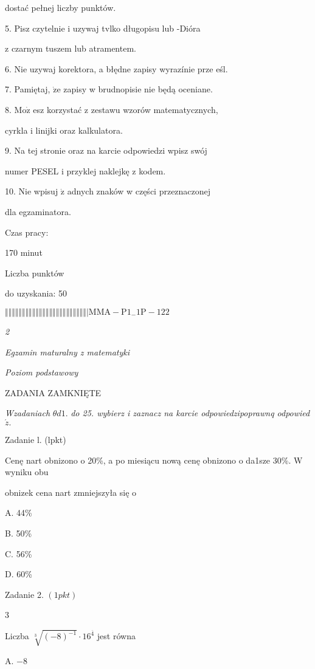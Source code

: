 \documentclass[a4paper,12pt]{article}
\begin{document}
dostać pełnej liczby punktów.

5. Pisz czytelnie i uzywaj tvlko długopisu lub -Dióra

z czarnym tuszem lub atramentem.

6. Nie uzywaj korektora, a błędne zapisy wyrazínie prze eśl.

7. Pamiętaj, $\dot{\mathrm{z}}\mathrm{e}$ zapisy w brudnopisie nie będą oceniane.

8. $\mathrm{M}\mathrm{o}\dot{\mathrm{z}}$ esz korzystać z zestawu wzorów matematycznych,

cyrkla i linijki oraz kalkulatora.

9. Na tej stronie oraz na karcie odpowiedzi wpisz swój

numer PESEL i przyklej naklejkę z kodem.

10. Nie wpisuj $\dot{\mathrm{z}}$ adnych znaków w części przeznaczonej

dla egzaminatora.

Czas pracy:

170 minut

Liczba punktów

do uzyskania: 50

$\Vert\Vert\Vert\Vert\Vert\Vert\Vert\Vert\Vert\Vert\Vert\Vert\Vert\Vert\Vert\Vert\Vert\Vert\Vert\Vert\Vert\Vert\Vert\Vert|  \mathrm{M}\mathrm{M}\mathrm{A}-\mathrm{P}1_{-}1\mathrm{P}-122$




{\it 2}

{\it Egzamin maturalny z matematyki}

{\it Poziom podstawowy}

ZADANIA ZAMKNIĘTE

{\it Wzadaniach} $\theta d1.$ {\it do 25. wybierz i zaznacz na karcie odpowiedzipoprawnq odpowied} $\acute{z}.$

Zadanie l. (lpkt)

Cenę nart obnizono o 20\%, a po miesiącu nową cenę obnizono o da1sze 30\%. W wyniku obu

obnizek cena nart zmniejszyła się o

A. 44\%

B. 50\%

C. 56\%

D. 60\%

Zadanie 2. $(1pkt)$

3

Liczba $\sqrt[3]{(-8)^{-1}}\cdot 16^{\overline{4}}$ jest równa

A. $-8$
\end{document}
